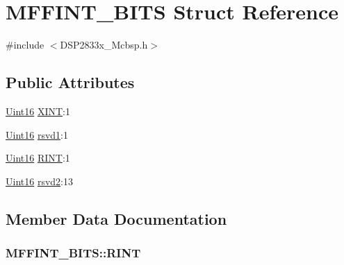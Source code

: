 \hypertarget{struct_m_f_f_i_n_t___b_i_t_s}{}\section{M\+F\+F\+I\+N\+T\+\_\+\+B\+I\+T\+S Struct Reference}
\label{struct_m_f_f_i_n_t___b_i_t_s}


{\ttfamily \#include $<$D\+S\+P2833x\+\_\+\+Mcbsp.\+h$>$}

\subsection*{Public Attributes}
\begin{DoxyCompactItemize}
\item 
\hyperlink{_d_s_p2833x___device_8h_a59a9f6be4562c327cbfb4f7e8e18f08b}{Uint16} \hyperlink{struct_m_f_f_i_n_t___b_i_t_s_acd0790c62473cd01e0e59e9d39a7a2ce}{X\+I\+N\+T}\+:1
\item 
\hyperlink{_d_s_p2833x___device_8h_a59a9f6be4562c327cbfb4f7e8e18f08b}{Uint16} \hyperlink{struct_m_f_f_i_n_t___b_i_t_s_ae615fbf6ac4624a8edcf32a4b6500648}{rsvd1}\+:1
\item 
\hyperlink{_d_s_p2833x___device_8h_a59a9f6be4562c327cbfb4f7e8e18f08b}{Uint16} \hyperlink{struct_m_f_f_i_n_t___b_i_t_s_ae1e81c03d8d986f4b6147abb15294540}{R\+I\+N\+T}\+:1
\item 
\hyperlink{_d_s_p2833x___device_8h_a59a9f6be4562c327cbfb4f7e8e18f08b}{Uint16} \hyperlink{struct_m_f_f_i_n_t___b_i_t_s_a6553e7674a77763dee29b597db063953}{rsvd2}\+:13
\end{DoxyCompactItemize}


\subsection{Member Data Documentation}
\hypertarget{struct_m_f_f_i_n_t___b_i_t_s_ae1e81c03d8d986f4b6147abb15294540}{}
\subsubsection[{R\+I\+N\+T}]{ M\+F\+F\+I\+N\+T\+\_\+\+B\+I\+T\+S\+::\+R\+I\+N\+T}\label{struct_m_f_f_i_n_t___b_i_t_s_ae1e81c03d8d986f4b6147abb15294540}
\hypertarget{struct_m_f_f_i_n_t___b_i_t_s_ae615fbf6ac4624a8edcf32a4b6500648}{}
